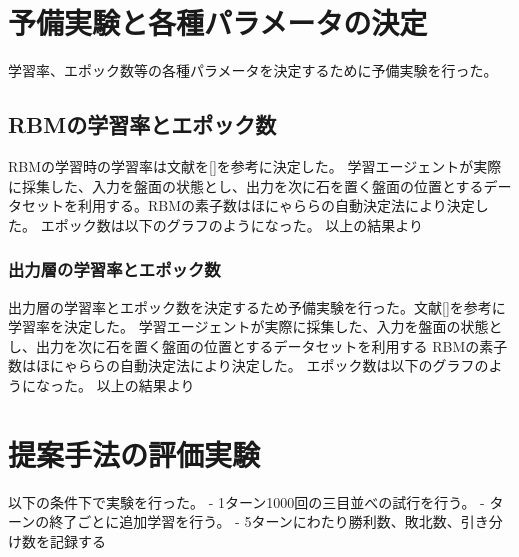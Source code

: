 \section{予備実験と各種パラメータの決定}

学習率、エポック数等の各種パラメータを決定するために予備実験を行った。

\subsection{RBMの学習率とエポック数}
RBMの学習時の学習率は文献を[]を参考に決定した。
学習エージェントが実際に採集した、入力を盤面の状態とし、出力を次に石を置く盤面の位置とするデータセットを利用する。RBMの素子数はほにゃららの自動決定法により決定した。
エポック数は以下のグラフのようになった。
以上の結果より

\subsubsection{出力層の学習率とエポック数}
出力層の学習率とエポック数を決定するため予備実験を行った。文献[]を参考に学習率を決定した。
学習エージェントが実際に採集した、入力を盤面の状態とし、出力を次に石を置く盤面の位置とするデータセットを利用する
RBMの素子数はほにゃららの自動決定法により決定した。
エポック数は以下のグラフのようになった。
以上の結果より


\section{提案手法の評価実験}
以下の条件下で実験を行った。
- 1ターン1000回の三目並べの試行を行う。
- ターンの終了ごとに追加学習を行う。
- 5ターンにわたり勝利数、敗北数、引き分け数を記録する\cite{kiso}

